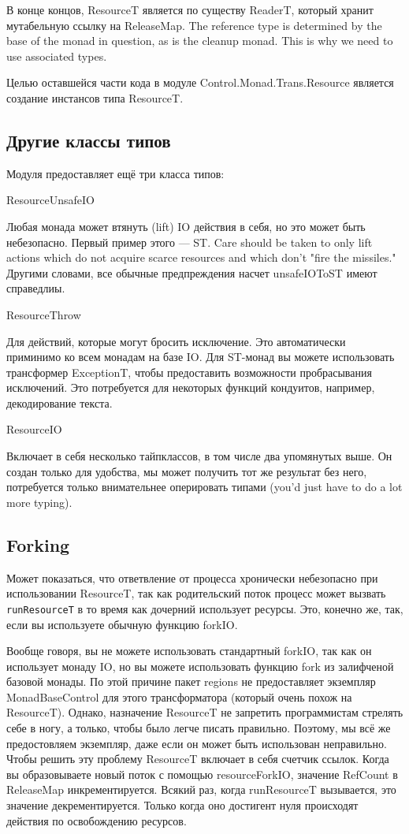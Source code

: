 В конце концов, ResourceT является по существу ReaderT, который хранит мутабельную
ссылку на ReleaseMap. The reference type is determined by the base
of the monad in question, as is the cleanup monad. This is why we need to use associated
types.

Целью оставшейся части кода в модуле Control.Monad.Trans.Resource
является создание инстансов типа ResourceT.

\subsection{Другие классы типов}

Модуля предоставляет ещё три класса типов:
   
ResourceUnsafeIO

Любая монада может втянуть (lift) IO действия в себя, но это может быть небезопасно.
Первый пример этого --- ST. Care should be taken to
only lift actions which do not acquire scarce resources and which don't "fire the
missiles." Другими словами, все обычные предпреждения насчет unsafeIOToST имеют
справедлиы.
  
ResourceThrow

Для действий, которые могут бросить исключение.  Это автоматически приминимо ко всем
монадам на базе IO. Для ST-монад вы можете использовать трансформер ExceptionT, чтобы
предоставить возможности пробрасывания исключений. Это потребуется для некоторых функций
кондуитов, например, декодирование текста.
   
ResourceIO

Включает в себя несколько тайпклассов, в том числе два
упомянутых выше. Он создан только для удобства, мы может получить тот же результат без
него, потребуется только внимательнее оперировать типами (you'd just have to do a lot
more typing).
   
\subsection{Forking}

Может показаться, что ответвление от процесса хронически небезопасно при использовании 
ResourceT, так как родительский поток процесс может вызвать \verb=runResourceT= в то время
как дочерний использует ресурсы. Это, конечно же, так, если вы используете обычную
функцию forkIO.

Вообще говоря, вы не можете использовать стандартный forkIO, так как он использует монаду
IO, но вы можете использовать функцию fork из залифченой базовой монады.
По этой причине пакет regions не предоставляет экземпляр MonadBaseControl для этого
трансформатора (который очень похож на ResourceT). Однако, назначение ResourceT
не запретить программистам стрелять себе в ногу, а только, чтобы было легче писать
правильно. Поэтому, мы всё же предостовляем экземпляр, даже если он может быть
использован неправильно. Чтобы решить эту проблему ResourceT включает в себя
счетчик ссылок. Когда вы образовываете новый поток с помощью resourceForkIO,
значение RefCount в ReleaseMap инкрементируется. Всякий раз, когда runResourceT
вызывается, это значение декрементируется. Только когда оно достигент нуля происходят
действия по освобождению ресурсов.
 
